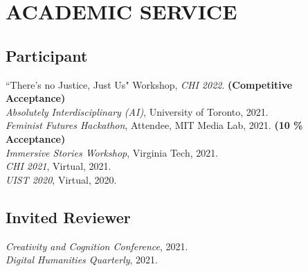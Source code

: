  \section{ACADEMIC SERVICE}

 \subsection{Participant}
``There's no Justice, Just Us" Workshop, \emph{CHI 2022}. \textbf{(Competitive Acceptance)}\\
\emph{Absolutely Interdisciplinary (AI)}, University of Toronto, 2021.\\
\emph{Feminist Futures Hackathon}, Attendee, MIT Media Lab, 2021. \textbf{(10 \% Acceptance)}\\
\emph{Immersive Stories Workshop}, Virginia Tech, 2021.\\
\emph{CHI 2021}, Virtual, 2021. \\
\emph{UIST 2020}, Virtual, 2020. 

  \subsection{Invited Reviewer}
 \emph{Creativity and Cognition Conference}, 2021. \\
  \emph{Digital Humanities Quarterly}, 2021. \\